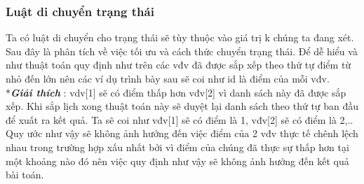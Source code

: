 \documentclass[13pt,a4paper]{article}
\begin{document}
\subsubsection{Luật di chuyển trạng thái}
Ta có luật di chuyển cho trạng thái sẽ tùy thuộc vào giá trị k chúng ta đang xét. Sau đây là phân tích về việc tối ưu và cách thức chuyển trạng thái. Để dễ hiểu và như thuật toán quy định như trên các vđv đã được sắp xếp theo thứ tự điểm từ nhỏ đến lớn nên các ví dụ trình bày sau sẽ coi như id là điểm của mỗi vđv. \\
$\ast$\textbf{\textit{Giải thích}} : vdv[1] sẽ có điểm thấp hơn vđv[2] vì danh sách này đã được sắp xếp. Khi sắp lịch xong thuật toán này sẽ duyệt lại danh sách theo thứ tự ban đầu để xuất ra kết quả. Ta sẽ coi như vđv[1] sẽ có điểm là 1, vđv[2] sẽ có điểm là 2,.. Quy ước như vậy sẽ không ảnh hưởng đến việc điểm của 2 vđv thực tế chênh lệch nhau trong trường hợp xấu nhất bởi vì điểm của chúng đã thực sự thấp hơn tại một khoảng nào đó nên việc quy định như vậy sẽ không ảnh hưởng đến kết quả bài toán.
\end{document}
